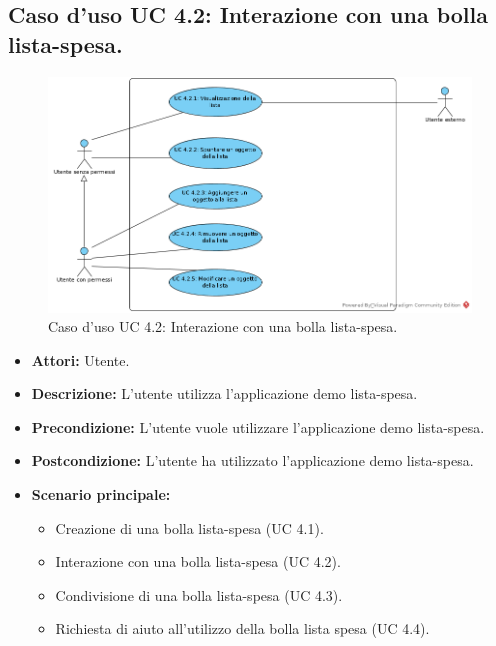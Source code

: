 \subsection{Caso d'uso UC 4.2: Interazione con una bolla lista-spesa.}
\label{Caso d'uso UC 4.2: Interazione con una bolla lista-spesa.}
\begin{figure}[ht]
	\centering
	\includegraphics[scale=0.60]{Usecases/img/UC4.2.png}
	\caption{Caso d'uso UC 4.2: Interazione con una bolla lista-spesa.}
\end{figure}

\FloatBarrier
\begin{itemize}
\item \textbf{Attori:} Utente.
\item \textbf{Descrizione:} L'utente utilizza l'applicazione demo lista-spesa.
\item \textbf{Precondizione:} L'utente vuole utilizzare l'applicazione demo lista-spesa. 
\item \textbf{Postcondizione:} L'utente ha utilizzato l'applicazione demo lista-spesa.
\item \textbf{Scenario principale:}
	\begin{itemize}
	\item{Creazione di una bolla lista-spesa (UC 4.1).}
	\item{Interazione con una bolla lista-spesa (UC 4.2).}
	\item{Condivisione di una bolla lista-spesa (UC 4.3).}
	\item{Richiesta di aiuto all'utilizzo della bolla lista spesa (UC 4.4).}
	\end{itemize}
\end{itemize}